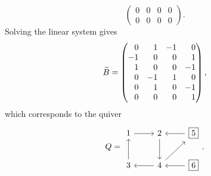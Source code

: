 \begin{example}
\begin{equation*}
\begin{pmatrix}
			0 & 0 & 0 & 0 \\
			0 & 0 & 0 & 0
		\end{pmatrix}.
	\end{equation*}
	Solving the linear system gives
	\begin{equation*}
		\tB = \begin{pmatrix*}[r]
			0  & 1  & -1 & 0  \\
			-1 & 0  & 0  & 1  \\
			1  & 0  & 0  & -1 \\
			0  & -1 & 1  & 0  \\
			0  & 1  & 0  & -1 \\
			0  & 0  & 0  & 1
		\end{pmatrix*},
	\end{equation*}
	which corresponds to the quiver
	\begin{equation*}
		Q =
		\begin{tikzcd}
			1 \rar & 2 \dar & \lar \boxed{5} \\
			3 \uar & 4 \lar \urar & \lar \boxed{6}
		\end{tikzcd}
		.
	\end{equation*}


\end{example}
